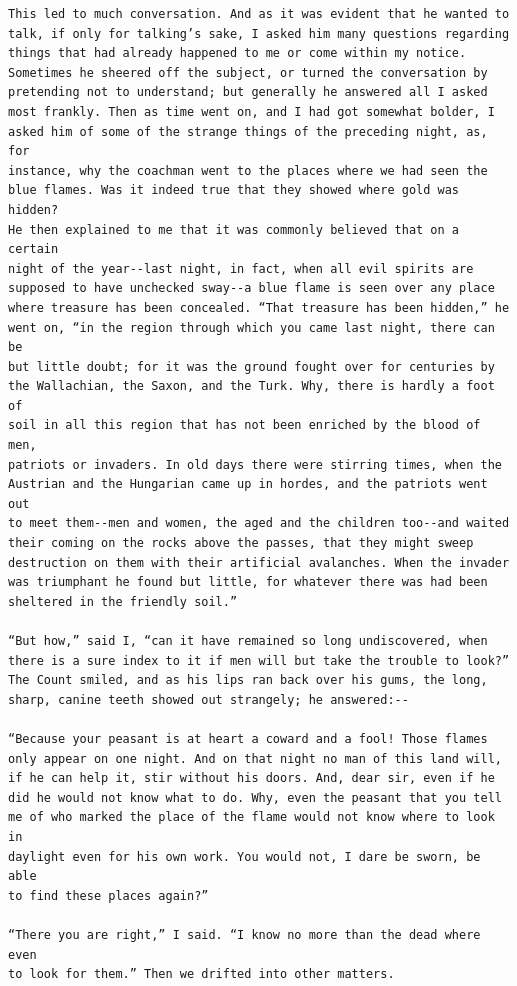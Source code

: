 \documentclass{article}
\begin{document}
\begin{verbatim}
This led to much conversation. And as it was evident that he wanted to
talk, if only for talking’s sake, I asked him many questions regarding
things that had already happened to me or come within my notice.
Sometimes he sheered off the subject, or turned the conversation by
pretending not to understand; but generally he answered all I asked
most frankly. Then as time went on, and I had got somewhat bolder, I
asked him of some of the strange things of the preceding night, as, for
instance, why the coachman went to the places where we had seen the
blue flames. Was it indeed true that they showed where gold was hidden?
He then explained to me that it was commonly believed that on a certain
night of the year--last night, in fact, when all evil spirits are
supposed to have unchecked sway--a blue flame is seen over any place
where treasure has been concealed. “That treasure has been hidden,” he
went on, “in the region through which you came last night, there can be
but little doubt; for it was the ground fought over for centuries by
the Wallachian, the Saxon, and the Turk. Why, there is hardly a foot of
soil in all this region that has not been enriched by the blood of men,
patriots or invaders. In old days there were stirring times, when the
Austrian and the Hungarian came up in hordes, and the patriots went out
to meet them--men and women, the aged and the children too--and waited
their coming on the rocks above the passes, that they might sweep
destruction on them with their artificial avalanches. When the invader
was triumphant he found but little, for whatever there was had been
sheltered in the friendly soil.”

“But how,” said I, “can it have remained so long undiscovered, when
there is a sure index to it if men will but take the trouble to look?”
The Count smiled, and as his lips ran back over his gums, the long,
sharp, canine teeth showed out strangely; he answered:--

“Because your peasant is at heart a coward and a fool! Those flames
only appear on one night. And on that night no man of this land will,
if he can help it, stir without his doors. And, dear sir, even if he
did he would not know what to do. Why, even the peasant that you tell
me of who marked the place of the flame would not know where to look in
daylight even for his own work. You would not, I dare be sworn, be able
to find these places again?”

“There you are right,” I said. “I know no more than the dead where even
to look for them.” Then we drifted into other matters.


\end{verbatim}
\end{document}
